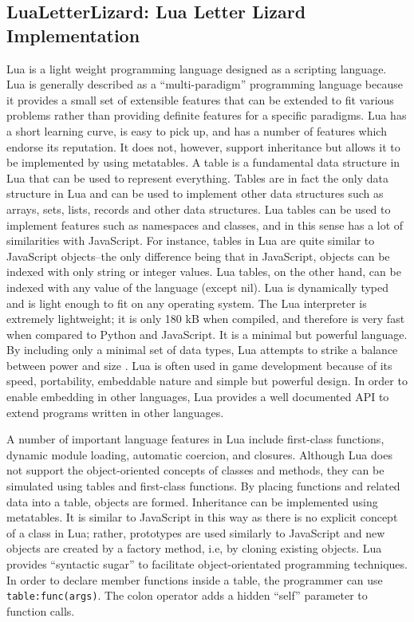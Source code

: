 \subsection{LuaLetterLizard: Lua Letter Lizard Implementation}
\label{luaimpl}

Lua is a light weight programming language designed as a scripting language. Lua is generally described as a ``multi-paradigm'' programming language because it provides a small set of extensible features that can be extended to fit various problems rather than providing definite features for a specific paradigms. Lua has a short learning curve, is easy to pick up, and has a number of features which endorse its reputation. It does not, however, support inheritance but allows it to be implemented by using metatables.
A table is a fundamental data structure in Lua that can be used to represent everything. Tables are in fact the only data structure in Lua and can be used to implement other data structures such as arrays, sets, lists, records and other data structures. Lua tables can be used to implement features such as namespaces and classes, and in this sense has a lot of similarities with JavaScript. For instance, tables in Lua are quite similar to JavaScript objects--the only difference being that in JavaScript, objects can be indexed with only string or integer values. Lua tables, on the other hand, can be indexed with any value of the language (except nil). 
Lua is dynamically typed and is light enough to fit on any operating system. The Lua interpreter is extremely lightweight; it is only 180 kB when compiled, and therefore is very fast when compared to Python and JavaScript. It is a minimal but powerful language. By including only a minimal set of data types, Lua attempts to strike a balance between power and size \cite{about_lua}.
Lua is often used in game development because of its speed, portability, embeddable nature and simple but powerful design. In order to enable embedding in other languages, Lua provides a well documented API to extend programs written in other languages. 

A number of important language features in Lua include first-class functions, dynamic module loading, automatic coercion, and closures. Although Lua does not support the object-oriented concepts of classes and methods, they can be simulated using tables and first-class functions. By placing functions and related data into a table, objects are formed. Inheritance can be implemented using metatables. It is similar to JavaScript in this way as there is no explicit concept of a class in Lua; rather, prototypes are used similarly to JavaScript and new objects are created by a factory method, i.e, by cloning existing objects. Lua provides ``syntactic sugar'' to facilitate object-orientated programming techniques. In order to declare member functions inside a table, the programmer can use \texttt{table:func(args)}. The colon operator adds a hidden ``self'' parameter to function calls.

